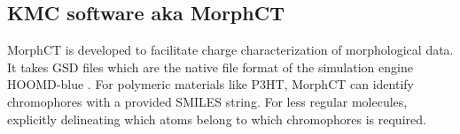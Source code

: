 \subsection{KMC software aka MorphCT}
\label{morph}
MorphCT is developed to facilitate charge characterization of morphological data. It takes GSD files which are
the native file format of the simulation engine HOOMD-blue \cite{Anderson2020a}.
For polymeric materials like P3HT, MorphCT
can identify chromophores with a provided SMILES string. For less regular molecules, explicitly delineating
which atoms belong to which chromophores is required.
